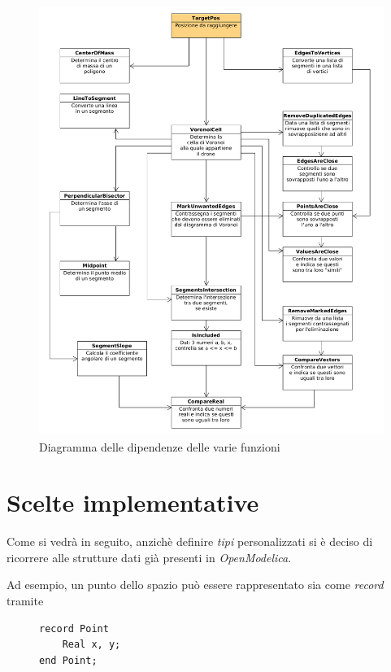 \documentclass[11pt,a4paper]{report}
\begin{document}
\begin{figure}[H]
\includegraphics[width=15cm]{uml_diagram/uml_diagram_lloyd.png}
\centering
\caption{Diagramma delle dipendenze delle varie funzioni}
\end{figure}

\section{Scelte implementative}

Come si vedrà in seguito, anzichè definire \textit{tipi} personalizzati si è deciso di ricorrere alle strutture dati già presenti in \textit{OpenModelica}.

Ad esempio, un punto dello spazio può essere rappresentato sia come \textit{record} tramite

\begin{figure}[H]
\begin{lstlisting}[language=Modelica]
record Point
	Real x, y;
end Point;
\end{lstlisting}
\end{figure}
\end{document}
